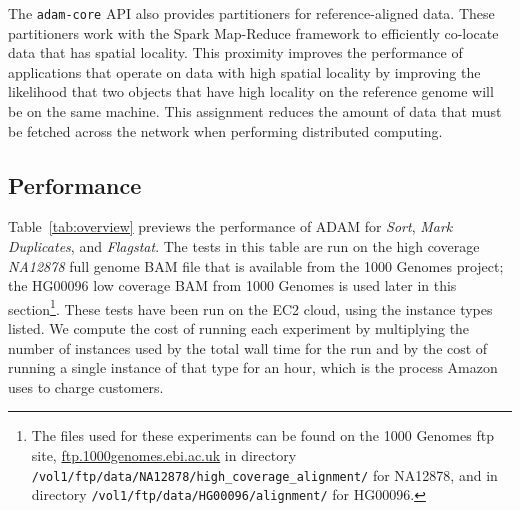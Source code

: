 \documentclass{bioinfo}
\begin{document}
The \texttt{adam-core} API also provides partitioners for reference-aligned data. These partitioners work with the Spark Map-Reduce framework to efficiently co-locate data that
has spatial locality. This proximity improves the performance of applications that operate on data with high spatial locality by improving the likelihood that two objects that have high
locality on the reference genome will be on the same machine. This assignment reduces the amount of data that must be fetched across the network when performing distributed computing.

\subsection{Performance}
\label{sec:performance}

Table~\ref{tab:overview} previews the performance of ADAM for \textit{Sort}, \textit{Mark Duplicates}, and \textit{Flagstat}. The tests in this table are run on
the high coverage \textit{NA12878} full genome BAM file that is available from the 1000 Genomes project; the HG00096 low coverage BAM from 1000 Genomes
is used later in this section\footnote{The files used for these experiments can be found on the 1000 Genomes ftp site, \url{ftp.1000genomes.ebi.ac.uk} in directory
\texttt{/vol1/ftp/data/NA12878/high\_coverage\_alignment/} for NA12878, and in directory \texttt{/vol1/ftp/data/HG00096/alignment/} for HG00096.}. These tests have been
run on the EC2 cloud, using the instance types listed. We compute the cost of running each experiment by multiplying the number of instances used by the total
wall time for the run and by the cost of running a single instance of that type for an hour, which is the process Amazon uses to charge customers.
\end{document}
